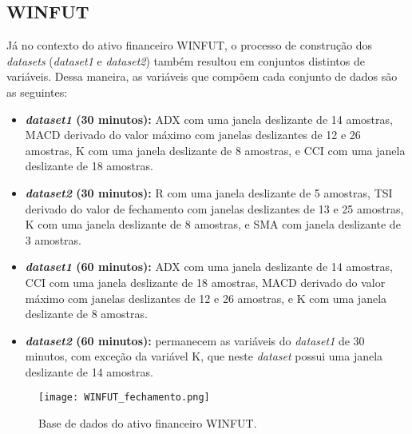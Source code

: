 \subsection{WINFUT}
Já no contexto do ativo financeiro WINFUT, o processo de construção dos \textit{datasets} (\textit{dataset1} e \textit{dataset2}) também resultou em conjuntos distintos de variáveis. Dessa maneira, as variáveis que compõem cada conjunto de dados são as seguintes:
\begin{itemize}
	\item \textbf{\textit{dataset1} (30 minutos):} \ac{ADX} com uma janela deslizante de 14 amostras, \ac{MACD} derivado do valor máximo com janelas deslizantes de 12 e 26 amostras, \ac{K} com uma janela deslizante de 8 amostras, e \ac{CCI} com uma janela deslizante de 18 amostras.
	
	\item \textbf{\textit{dataset2} (30 minutos):}  \ac{R} com uma janela deslizante de 5 amostras, \ac{TSI} derivado do valor de fechamento com janelas deslizantes de 13 e 25 amostras, \ac{K} com uma janela deslizante de 8 amostras, e \ac{SMA} com janela deslizante de 3 amostras.
	
	\item \textbf{\textit{dataset1} (60 minutos):} \ac{ADX} com uma janela deslizante de 14 amostras, \ac{CCI} com uma janela deslizante de 18 amostras, \ac{MACD} derivado do valor máximo com janelas deslizantes de 12 e 26 amostras, e \ac{K} com uma janela deslizante de 8 amostras.
	
	\item \textbf{\textit{dataset2} (60 minutos):} permanecem as variáveis do \textit{dataset1} de 30 minutos, com exceção da variável \ac{K}, que neste \textit{dataset} possui uma janela deslizante de 14 amostras.
\end{itemize}

\begin{figure}[htbp]
	\caption{Base de dados do ativo financeiro WINFUT.}
	\centering
	\texttt{[image: WINFUT\_fechamento.png]} 
	\label{fig:WINFUT_fechamento}
\end{figure}


